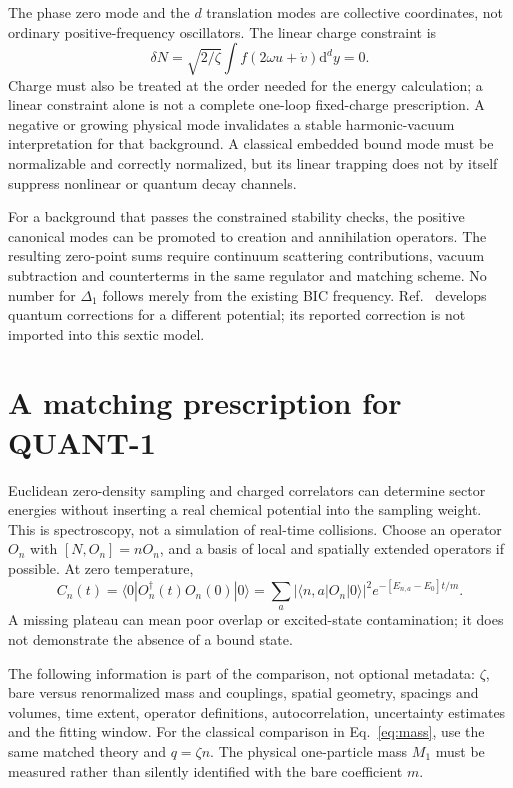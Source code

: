 \documentclass[11pt,a4paper]{article}
\newcommand{\dd}{\mathrm d}
\begin{document}
The phase zero mode and the $d$ translation modes are collective coordinates,
not ordinary positive-frequency oscillators. The linear charge constraint is
\begin{equation}
 \delta N=\sqrt{2/\zeta}\int f(2\omega u+\dot v)\dd^dy=0.
\end{equation}
Charge must also be treated at the order needed for the energy calculation;
a linear constraint alone is not a complete one-loop fixed-charge prescription.
A negative or growing physical mode invalidates a stable harmonic-vacuum
interpretation for that background. A classical embedded bound mode must be
normalizable and correctly normalized, but its linear trapping does not by
itself suppress nonlinear or quantum decay channels.

For a background that passes the constrained stability checks, the positive
canonical modes can be promoted to creation and annihilation operators.
The resulting zero-point sums require continuum scattering contributions,
vacuum subtraction and counterterms in the same regulator and matching
scheme. No number for $\Delta_1$ follows merely from the existing BIC frequency.
Ref.~\cite{graham} develops quantum corrections for a different potential;
its reported correction is not imported into this sextic model.

\section{A matching prescription for QUANT-1}
Euclidean zero-density sampling and charged correlators can determine sector
energies without inserting a real chemical potential into the sampling
weight. This is spectroscopy, not a simulation of real-time collisions.
Choose an operator $O_n$ with $[N,O_n]=nO_n$, and a basis of local and
spatially extended operators if possible. At zero temperature,
\begin{equation}
 C_n(t)=\langle0|O_n^\dagger(t)O_n(0)|0\rangle
 =\sum_a|\langle n,a|O_n|0\rangle|^2
 e^{-[E_{n,a}-E_0]t/m}.
\end{equation}
A missing plateau can mean poor overlap or excited-state contamination;
it does not demonstrate the absence of a bound state.

The following information is part of the comparison, not optional metadata:
$\zeta$, bare versus renormalized mass and couplings, spatial geometry,
spacings and volumes, time extent, operator definitions, autocorrelation,
uncertainty estimates and the fitting window. For the classical comparison
in Eq.~\eqref{eq:mass}, use the same matched theory and $q=\zeta n$.
The physical one-particle mass $M_1$ must be measured rather than silently
identified with the bare coefficient $m$.
\end{document}
